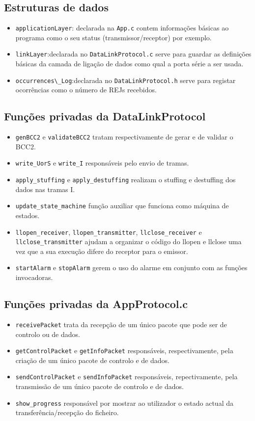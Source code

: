 \documentclass[11pt,a4paper,reqno]{report}
\numberwithin{equation}{section}
\begin{document}
\subsection{Estruturas de dados}
\begin{itemize}
\item \verb|applicationLayer|: declarada na \verb|App.c| contem informações básicas ao programa como o seu status (transmissor/receptor) por exemplo. 	
\item \verb|linkLayer|:declarada no \verb|DataLinkProtocol.c| serve para guardar as definições básicas da camada de ligação de dados como qual a porta série a ser usada.	
\item \verb|occurrences\_Log|:declarada no \verb|DataLinkProtocol.h| serve para registar ocorrências como o número de REJs recebidos.	
\end{itemize}

\subsection{Funções privadas da DataLinkProtocol}
\begin{itemize}
\item \verb|genBCC2| e \verb|validateBCC2| tratam respectivamente de gerar e de validar o BCC2.
\item \verb|write_UorS| e \verb|write_I| responsáveis pelo envio de tramas.
\item \verb|apply_stuffing| e \verb|apply_destuffing| realizam o stuffing e destuffing dos dados nas tramas I.
\item \verb|update_state_machine| função auxiliar que funciona como máquina de estados.
\item \verb|llopen_receiver|, \verb|llopen_transmitter|, \verb|llclose_receiver| e \verb|llclose_transmitter| ajudam a organizar o código do llopen e llclose uma vez que a sua execução difere do receptor para o emissor.
\item \verb|startAlarm| e \verb|stopAlarm| gerem o uso do alarme em conjunto com as funções invocadoras.
\end{itemize}

\subsection{Funções privadas da AppProtocol.c}
\begin{itemize}
\item \verb|receivePacket| trata da recepção de um único pacote que pode ser de controlo ou de dados.
\item \verb|getControlPacket| e \verb|getInfoPacket| responsáveis, respectivamente, pela criação de um único pacote de controlo e de dados.
\item \verb|sendControlPacket| e \verb|sendInfoPacket| responsáveis, repectivamente, pela transmissão de um único pacote de controlo e de dados.
\item \verb|show_progress| responsável por mostrar ao utilizador o estado actual da transferência/recepção do ficheiro.
\end{itemize}
\end{document}
